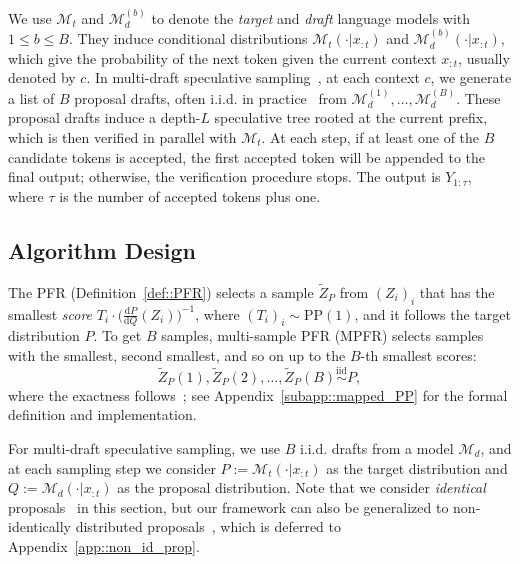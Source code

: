 \documentclass{article}
\theoremstyle{plain}
\theoremstyle{definition}
\begin{document}
We use $\mathcal{M}_t$ and $\mathcal{M}_d^{(b)}$ to denote the \emph{target} and \emph{draft} language models with %
$1\leq b\leq B$. They induce conditional distributions $\mathcal{M}_t(\cdot| x_{:t})$ and $\mathcal{M}_d^{(b)}(\cdot| x_{:t})$, which give the probability of the next token given the current context $x_{:t}$, usually denoted by $c$.
In multi-draft speculative sampling~\citep{miao2024specinfer, sun2023spectr, khisti2024multi, rowan2025list}, at each context $c$, we generate a list of $B$ proposal drafts, often i.i.d. in practice~\citep{rowan2025list, sun2023spectr}  from $\mathcal{M}_d^{(1)}, \ldots, \mathcal{M}_d^{(B)}$. These proposal drafts %
induce a depth-$L$ speculative tree rooted at the current prefix, which is then verified %
in parallel with $\mathcal{M}_t$.
At each step, %
if at least one of the $B$ candidate tokens is accepted, %
the first accepted token will be appended to the final output; otherwise, the verification procedure stops. 
The output is $Y_{1:\tau}$, where $\tau$ is the number of accepted tokens plus one.

\subsection{Algorithm Design}

The PFR (Definition~\ref{def::PFR}) selects a sample $\tilde{Z}_P$ from $(Z_i)_i$ that has the smallest \emph{score} $T_i\cdot \big(\frac{\mathrm{d}P}{\mathrm{d}Q}(Z_i)\big)^{-1}$, where $(T_i)_i\sim \mathrm{PP}(1)$, and it follows the target distribution $P$. 
To get $B$ samples, multi-sample PFR (MPFR) selects samples with the smallest, second smallest, and so on up to the $B$-th smallest scores:
\begin{equation}
    \tilde{Z}_P(1), \tilde{Z}_P(2),\ldots, \tilde{Z}_P(B) \stackrel{\mathrm{iid}}{\sim} P, \label{eq::MPFR}
\end{equation}
where the exactness follows~\citep{li2021unified}; see Appendix~\ref{subapp::mapped_PP} for the formal definition and implementation. 


For multi-draft speculative sampling, we use $B$ i.i.d. drafts from a model $\mathcal{M}_d$, and at each sampling step we consider $P := \mathcal{M}_t(\cdot| x_{:t})$ as the target distribution and $Q := \mathcal{M}_d(\cdot| x_{:t})$ as the proposal distribution. 
Note that we consider \emph{identical} proposals~\citep{sun2023spectr} in this section, but our framework can also be generalized to non-identically distributed proposals~\citep{rowan2025list}, which is deferred to Appendix~\ref{app::non_id_prop}. 
\end{document}
